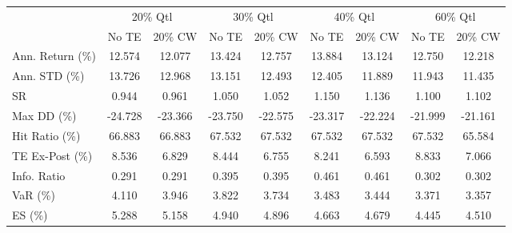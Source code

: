 \begin{tabular}{lcccccccc}
\toprule
{} & \multicolumn{2}{c}{20\% Qtl} & \multicolumn{2}{c}{30\% Qtl} & \multicolumn{2}{c}{40\% Qtl} & \multicolumn{2}{c}{60\% Qtl} \\
{} &   No TE &  20\% CW &   No TE &  20\% CW &   No TE &  20\% CW &   No TE &  20\% CW \\
\midrule
Ann. Return (\%) &  12.574 &  12.077 &  13.424 &  12.757 &  13.884 &  13.124 &  12.750 &  12.218 \\
Ann. STD (\%)    &  13.726 &  12.968 &  13.151 &  12.493 &  12.405 &  11.889 &  11.943 &  11.435 \\
SR              &   0.944 &   0.961 &   1.050 &   1.052 &   1.150 &   1.136 &   1.100 &   1.102 \\
Max DD (\%)      & -24.728 & -23.366 & -23.750 & -22.575 & -23.317 & -22.224 & -21.999 & -21.161 \\
Hit Ratio (\%)   &  66.883 &  66.883 &  67.532 &  67.532 &  67.532 &  67.532 &  67.532 &  65.584 \\
TE Ex-Post (\%)  &   8.536 &   6.829 &   8.444 &   6.755 &   8.241 &   6.593 &   8.833 &   7.066 \\
Info. Ratio     &   0.291 &   0.291 &   0.395 &   0.395 &   0.461 &   0.461 &   0.302 &   0.302 \\
VaR (\%)         &   4.110 &   3.946 &   3.822 &   3.734 &   3.483 &   3.444 &   3.371 &   3.357 \\
ES (\%)          &   5.288 &   5.158 &   4.940 &   4.896 &   4.663 &   4.679 &   4.445 &   4.510 \\
\bottomrule
\end{tabular}

